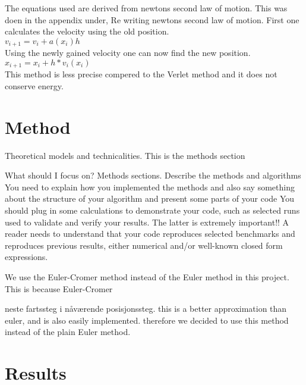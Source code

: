 \documentclass{article}
\begin{document}
    The equations used are derived from newtons second law of motion. This was doen in the appendix under, Re writing newtons second law of motion.
    First one calculates the velocity using the old position. \\

    $v_{i+1} = v_i +  a(x_i)h$ \\

    Using the newly gained velocity one can now find the new position. \\

    $x_{i+1} = x_i +  h*v_{i}(x_i) $ \\

    This method is less precise compered to the Verlet method and it does not conserve energy. \\


\vspace{1cm}

\section{Method} \label{sec:Method}

Theoretical models and technicalities. This is the methods section


What should I focus on? Methods sections.
Describe the methods and algorithms
You need to explain how you implemented the methods and also say something about the structure of your algorithm and present some parts of your code
You should plug in some calculations to demonstrate your code, such as selected runs used to validate and verify your results. The latter is extremely important!! A reader needs to understand that your code reproduces selected benchmarks and reproduces previous results, either numerical and/or well-known closed form expressions.

        We use the Euler-Cromer method instead of the Euler method in this project. This is because Euler-Cromer

        neste fartssteg i nåværende posisjonssteg. this is a better approximation than euler, and is also easily implemented. therefore we decided to use this method instead of the plain Euler method. 




\vspace{1cm}

\section{Results} \label{sec:Results}
\end{document}
